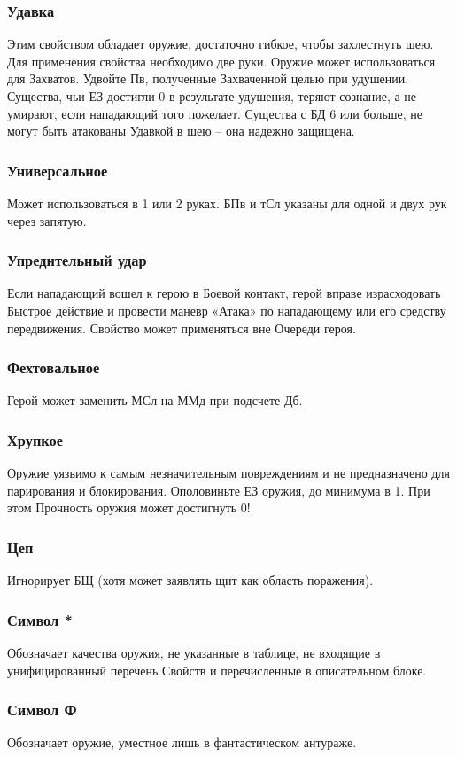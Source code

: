\subsubsection{Удавка} Этим свойством обладает оружие, достаточно гибкое, чтобы захлестнуть шею. 
\newline Для применения свойства необходимо две руки. Оружие может использоваться для Захватов. Удвойте Пв, полученные Захваченной целью при удушении. Существа, чьи ЕЗ достигли 0 в результате удушения, теряют сознание, а не умирают, если нападающий того пожелает. 	
\newline Существа с БД 6 или больше, не могут быть атакованы Удавкой в шею – она надежно защищена.
\subsubsection{Универсальное} Может использоваться в 1 или 2 руках. БПв и тСл указаны для одной и двух рук через запятую.
\subsubsection{Упредительный удар} Если нападающий вошел к герою в Боевой контакт, герой вправе израсходовать Быстрое действие и провести маневр «Атака» по нападающему или его средству передвижения. Свойство может применяться вне Очереди героя.
\subsubsection{Фехтовальное} Герой может заменить МСл на ММд при подсчете Дб.
\subsubsection{Хрупкое} Оружие уязвимо к самым незначительным повреждениям и не предназначено для парирования и блокирования. Ополовиньте ЕЗ оружия, до минимума в 1. При этом Прочность оружия может достигнуть 0!
\subsubsection{Цеп} Игнорирует БЩ (хотя может заявлять щит как область поражения). 
\subsubsection{Символ *} Обозначает качества оружия, не указанные в таблице, не входящие в унифицированный перечень Свойств и перечисленные в описательном блоке.
\subsubsection{Символ Ф} Обозначает оружие, уместное лишь в фантастическом антураже.

